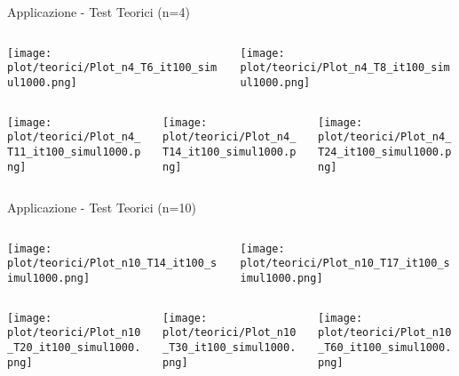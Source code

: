 \documentclass{beamer}
\newcommand{\1}{\mathbbm{1}}
\begin{document}
\begin{frame}{Applicazione - Test Teorici (n=4)}
\begin{columns}
\begin{column}{0.5\linewidth}
\texttt{[image: plot/teorici/Plot\_n4\_T6\_it100\_simul1000.png]}
\end{column}
\begin{column}{0.5\linewidth}
\texttt{[image: plot/teorici/Plot\_n4\_T8\_it100\_simul1000.png]}
\end{column}
\end{columns}

\begin{columns}
\begin{column}{0.33\linewidth}
\texttt{[image: plot/teorici/Plot\_n4\_T11\_it100\_simul1000.png]}
\end{column}
\begin{column}{0.33\linewidth}
\texttt{[image: plot/teorici/Plot\_n4\_T14\_it100\_simul1000.png]}
\end{column}
\begin{column}{0.33\linewidth}
\texttt{[image: plot/teorici/Plot\_n4\_T24\_it100\_simul1000.png]}
\end{column}
\end{columns}
\end{frame}

\begin{frame}{Applicazione - Test Teorici (n=10)}
\begin{columns}
\begin{column}{0.5\linewidth}
\texttt{[image: plot/teorici/Plot\_n10\_T14\_it100\_simul1000.png]}
\end{column}
\begin{column}{0.5\linewidth}
\texttt{[image: plot/teorici/Plot\_n10\_T17\_it100\_simul1000.png]}
\end{column}
\end{columns}

\begin{columns}
\begin{column}{0.33\linewidth}
\texttt{[image: plot/teorici/Plot\_n10\_T20\_it100\_simul1000.png]}
\end{column}
\begin{column}{0.33\linewidth}
\texttt{[image: plot/teorici/Plot\_n10\_T30\_it100\_simul1000.png]}
\end{column}
\begin{column}{0.33\linewidth}
\texttt{[image: plot/teorici/Plot\_n10\_T60\_it100\_simul1000.png]}
\end{column}
\end{columns}
\end{frame}
\end{document}
